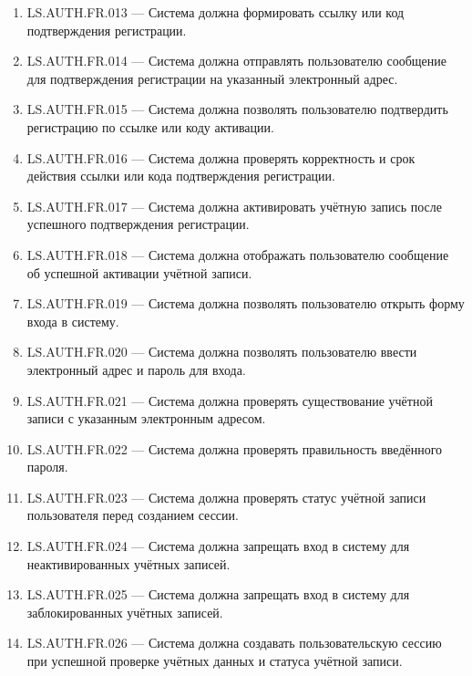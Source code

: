 \documentclass[12pt,a4paper]{article}
\begin{document}
\begin{enumerate}
		\item LS.AUTH.FR.013 --- Система должна формировать ссылку или код
		подтверждения регистрации.
		
		\item LS.AUTH.FR.014 --- Система должна отправлять пользователю сообщение для
		подтверждения регистрации на указанный электронный адрес.
		
		\item LS.AUTH.FR.015 --- Система должна позволять пользователю подтвердить
		регистрацию по ссылке или коду активации.
		
		\item LS.AUTH.FR.016 --- Система должна проверять корректность и срок действия
		ссылки или кода подтверждения регистрации.
		
		\item LS.AUTH.FR.017 --- Система должна активировать учётную запись после
		успешного подтверждения регистрации.
		
		\item LS.AUTH.FR.018 --- Система должна отображать пользователю сообщение об
		успешной активации учётной записи.
		
		\item LS.AUTH.FR.019 --- Система должна позволять пользователю открыть форму
		входа в систему.
		
		\item LS.AUTH.FR.020 --- Система должна позволять пользователю ввести
		электронный адрес и пароль для входа.
		
		\item LS.AUTH.FR.021 --- Система должна проверять существование учётной записи
		с указанным электронным адресом.
		
		\item LS.AUTH.FR.022 --- Система должна проверять правильность введённого
		пароля.
		
		\item LS.AUTH.FR.023 --- Система должна проверять статус учётной записи
		пользователя перед созданием сессии.
		
		\item LS.AUTH.FR.024 --- Система должна запрещать вход в систему для
		неактивированных учётных записей.
		
		\item LS.AUTH.FR.025 --- Система должна запрещать вход в систему для
		заблокированных учётных записей.
		
		\item LS.AUTH.FR.026 --- Система должна создавать пользовательскую сессию при
		успешной проверке учётных данных и статуса учётной записи.
		

\end{enumerate}
\end{document}
